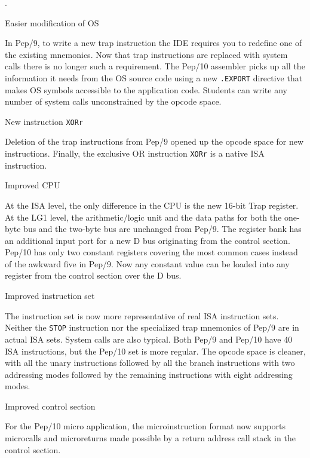 \documentclass[10pt,fleqn]{book}
\newenvironment{exercises}
   {\begin{list}
      {\arabic{ecounter}.}
      {
         \usecounter{ecounter}
         \setcounter {ecounter}{0}
         \setlength\leftmargin{2pc}
         \setlength\labelwidth{6pc}
         \setlength\labelsep{1pc}
      }}
   {\end{list}}
\newcounter{ecounter}
\begin{document}
\begin{exercises}
\item Easier modification of OS

In Pep/9, to write a new trap instruction the IDE requires you to redefine one of the existing mnemonics.
Now that trap instructions are replaced with system calls there is no longer such a requirement.
The Pep/10 assembler picks up all the information it needs from the OS source code using a new \verb|.EXPORT| directive that makes OS symbols accessible to the application code.
Students can write any number of system calls unconstrained by the opcode space.

\item New instruction \verb|XORr|

Deletion of the trap instructions from Pep/9 opened up the opcode space for new instructions.
Finally, the exclusive OR instruction \verb|XORr| is a native ISA instruction.

\item Improved CPU

At the ISA level, the only difference in the CPU is the new 16-bit Trap register.
At the LG1 level, the arithmetic/logic unit and the data paths for both the one-byte bus and the two-byte bus are unchanged from Pep/9.
The register bank has an additional input port for a new D bus originating from the control section.
Pep/10 has only two constant registers covering the most common cases instead of the awkward five in Pep/9.
Now any constant value can be loaded into any register from the control section over the D bus.

\item Improved instruction set

The instruction set is now more representative of real ISA instruction sets.
Neither the \verb|STOP| instruction nor the specialized trap mnemonics of Pep/9 are in actual ISA sets.
System calls are also typical.
Both Pep/9 and Pep/10 have 40 ISA instructions, but the Pep/10 set is more regular.
The opcode space is cleaner, with all the unary instructions followed by all the branch instructions with two addressing modes
followed by the remaining instructions with eight addressing modes.

\item Improved control section

For the Pep/10 micro application, the microinstruction format now supports microcalls and microreturns made possible by a return address call stack in the control section.

\end{exercises}
\end{document}
